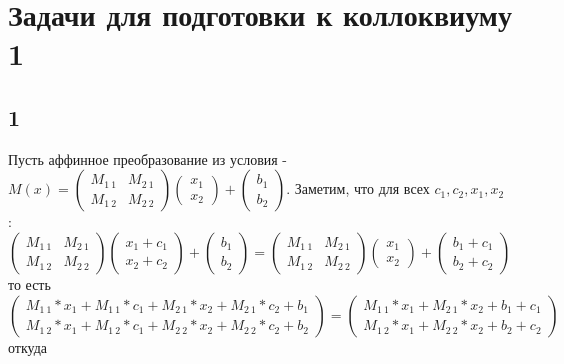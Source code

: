 \newpage
	\section{Задачи для подготовки к коллоквиуму 1}
		\subsection{1}
		Пусть аффинное преобразование из условия - $M(x) = \begin{pmatrix} M_{1\ 1} & M_{2\ 1} \\ M_{1\ 2} & M_{2\ 2} \end{pmatrix} \begin{pmatrix} x_1 \\ x_2 \end{pmatrix} + \begin{pmatrix} b_1 \\ b_2 \end{pmatrix} $. Заметим, что для всех $c_1, c_2, x_1, x_2$ : 
		$\begin{pmatrix} M_{1\ 1} & M_{2\ 1} \\ M_{1\ 2} & M_{2\ 2} \end{pmatrix} \begin{pmatrix} x_1 + c_1 \\ x_2 + c_2 \end{pmatrix} + \begin{pmatrix} b_1 \\ b_2 \end{pmatrix} = 
		\begin{pmatrix} M_{1\ 1} & M_{2\ 1} \\ M_{1\ 2} & M_{2\ 2} \end{pmatrix} \begin{pmatrix} x_1 \\ x_2 \end{pmatrix} + \begin{pmatrix} b_1 + c_1 \\ b_2 + c_2 \end{pmatrix} $\\ то есть \\
		$\begin{pmatrix} M_{1\ 1}*x_1 + M_{1\ 1}*c_1 + M_{2\ 1}*x_2 + M_{2\ 1}*c_2 + b_1 \\ M_{1\ 2}*x_1 + M_{1\ 2}*c_1 + M_{2\ 2}*x_2 + M_{2\ 2}*c_2 + b_2 \end{pmatrix} =
		\begin{pmatrix} M_{1\ 1}*x_1 + M_{2\ 1}*x_2 + b_1 + c_1 \\ M_{1\ 2}*x_1 + M_{2\ 2}*x_2 + b_2 + c_2 \end{pmatrix}$\\ откуда \\ 
